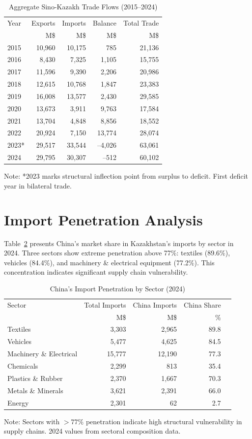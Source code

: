 \documentclass[12pt]{article}
\begin{document}
\begin{table}[H]
\centering
\small
\caption{Aggregate Sino-Kazakh Trade Flows (2015--2024)}
\label{tab:annual_trends}
\begin{tabular}{lrrrr}
\toprule
Year & Exports & Imports & Balance & Total Trade \\
 & M\$ & M\$ & M\$ & M\$ \\
\midrule
2015 & 10,960 & 10,175 & 785 & 21,136 \\
2016 & 8,430 & 7,325 & 1,105 & 15,755 \\
2017 & 11,596 & 9,390 & 2,206 & 20,986 \\
2018 & 12,615 & 10,768 & 1,847 & 23,383 \\
2019 & 16,008 & 13,577 & 2,430 & 29,585 \\
2020 & 13,673 & 3,911 & 9,763 & 17,584 \\
2021 & 13,704 & 4,848 & 8,856 & 18,552 \\
2022 & 20,924 & 7,150 & 13,774 & 28,074 \\
2023* & 29,517 & 33,544 & --4,026 & 63,061 \\
2024 & 29,795 & 30,307 & --512 & 60,102 \\
\bottomrule
\end{tabular}
\footnotesize
Note: *2023 marks structural inflection point from surplus to deficit. First deficit year in bilateral trade.
\end{table}

\section{Import Penetration Analysis}

Table~\ref{tab:penetration} presents China's market share in Kazakhstan's imports by sector in 2024. Three sectors show extreme penetration above 77\%: textiles (89.6\%), vehicles (84.4\%), and machinery \& electrical equipment (77.2\%). This concentration indicates significant supply chain vulnerability.

\begin{table}[H]
\centering
\small
\caption{China's Import Penetration by Sector (2024)}
\label{tab:penetration}
\begin{tabular}{lrrrr}
\toprule
Sector & Total Imports & China Imports & China Share \\
 & M\$ & M\$ & \% \\
\midrule
Textiles & 3,303 & 2,965 & 89.8 \\
Vehicles & 5,477 & 4,625 & 84.5 \\
Machinery \& Electrical & 15,777 & 12,190 & 77.3 \\
Chemicals & 2,299 & 813 & 35.4 \\
Plastics \& Rubber & 2,370 & 1,667 & 70.3 \\
Metals \& Minerals & 3,621 & 2,391 & 66.0 \\
Energy & 2,301 & 62 & 2.7 \\
\bottomrule
\end{tabular}
\footnotesize
Note: Sectors with $>77\%$ penetration indicate high structural vulnerability in supply chains. 2024 values from sectoral composition data.
\end{table}
\end{document}
